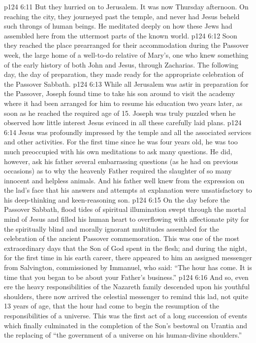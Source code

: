 \vs p124 6:11 But they hurried on to Jerusalem. It was now Thursday afternoon. On reaching the city, they journeyed past the temple, and never had Jesus beheld such throngs of human beings. He meditated deeply on how these Jews had assembled here from the uttermost parts of the known world.
\vs p124 6:12 Soon they reached the place prearranged for their accommodation during the Passover week, the large home of a well\hyp{}to\hyp{}do relative of Mary’s, one who knew something of the early history of both John and Jesus, through Zacharias. The following day, the day of preparation, they made ready for the appropriate celebration of the Passover Sabbath.
\vs p124 6:13 While all Jerusalem was astir in preparation for the Passover, Joseph found time to take his son around to visit the academy where it had been arranged for him to resume his education two years later, as soon as he reached the required age of 15. Joseph was truly puzzled when he observed how little interest Jesus evinced in all these carefully laid plans.
\vs p124 6:14 Jesus was profoundly impressed by the temple and all the associated services and other activities. For the first time since he was four years old, he was too much preoccupied with his own meditations to ask many questions. He did, however, ask his father several embarrassing questions (as he had on previous occasions) as to why the heavenly Father required the slaughter of so many innocent and helpless animals. And his father well knew from the expression on the lad’s face that his answers and attempts at explanation were unsatisfactory to his deep\hyp{}thinking and keen\hyp{}reasoning son.
\vs p124 6:15 \pc On the day before the Passover Sabbath, flood tides of spiritual illumination swept through the mortal mind of Jesus and filled his human heart to overflowing with affectionate pity for the spiritually blind and morally ignorant multitudes assembled for the celebration of the ancient Passover commemoration. This was one of the most extraordinary days that the Son of God spent in the flesh; and during the night, for the first time in his earth career, there appeared to him an assigned messenger from Salvington, commissioned by Immanuel, who said: “The hour has come. It is time that you began to be about your Father’s business.”
\vs p124 6:16 And so, even ere the heavy responsibilities of the Nazareth family descended upon his youthful shoulders, there now arrived the celestial messenger to remind this lad, not quite 13 years of age, that the hour had come to begin the resumption of the responsibilities of a universe. This was the first act of a long succession of events which finally culminated in the completion of the Son’s bestowal on Urantia and the replacing of “the government of a universe on his human\hyp{}divine shoulders.”
